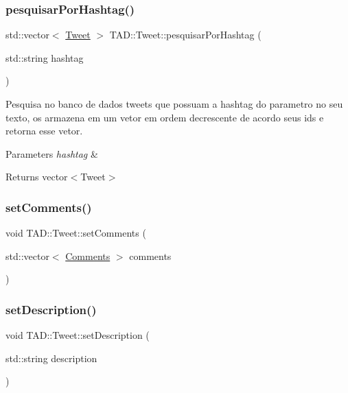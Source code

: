 \subsubsection{\texorpdfstring{pesquisar\+Por\+Hashtag()}{pesquisarPorHashtag()}}
{\footnotesize\ttfamily std\+::vector$<$ \hyperlink{class_t_a_d_1_1_tweet}{Tweet} $>$ T\+A\+D\+::\+Tweet\+::pesquisar\+Por\+Hashtag (\begin{DoxyParamCaption}\item[{std\+::string}]{hashtag }\end{DoxyParamCaption})}



Pesquisa no banco de dados tweets que possuam a hashtag do parametro no seu texto, os armazena em um vetor em ordem decrescente de acordo seus id\textquotesingle{}s e retorna esse vetor. 


\begin{DoxyParams}{Parameters}
{\em hashtag} & \\
\hline
\end{DoxyParams}
\begin{DoxyReturn}{Returns}
vector$<$\+Tweet$>$ 
\end{DoxyReturn}
\mbox{\label{class_t_a_d_1_1_tweet_ac38fbf3aa171c60d535282ee1ec3d132}} 
\subsubsection{\texorpdfstring{set\+Comments()}{setComments()}}
{\footnotesize\ttfamily void T\+A\+D\+::\+Tweet\+::set\+Comments (\begin{DoxyParamCaption}\item[{std\+::vector$<$ \hyperlink{class_t_a_d_1_1_comments}{Comments} $>$}]{comments }\end{DoxyParamCaption})}

\mbox{\label{class_t_a_d_1_1_tweet_a1a999b2e287aed6d0f516861c99552e4}} 
\subsubsection{\texorpdfstring{set\+Description()}{setDescription()}}
{\footnotesize\ttfamily void T\+A\+D\+::\+Tweet\+::set\+Description (\begin{DoxyParamCaption}\item[{std\+::string}]{description }\end{DoxyParamCaption})}

